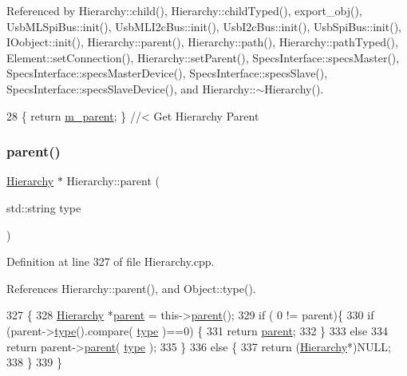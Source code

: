 Referenced by Hierarchy\+::child(), Hierarchy\+::child\+Typed(), export\+\_\+obj(), Usb\+M\+L\+Spi\+Bus\+::init(), Usb\+M\+L\+I2c\+Bus\+::init(), Usb\+I2c\+Bus\+::init(), Usb\+Spi\+Bus\+::init(), I\+Oobject\+::init(), Hierarchy\+::parent(), Hierarchy\+::path(), Hierarchy\+::path\+Typed(), Element\+::set\+Connection(), Hierarchy\+::set\+Parent(), Specs\+Interface\+::specs\+Master(), Specs\+Interface\+::specs\+Master\+Device(), Specs\+Interface\+::specs\+Slave(), Specs\+Interface\+::specs\+Slave\+Device(), and Hierarchy\+::$\sim$\+Hierarchy().


\begin{DoxyCode}
28 \{ \textcolor{keywordflow}{return} \hyperlink{classHierarchy_a5814bb280d4e8539ab25ab6cbfb9cc4f}{m\_parent}; \}  \textcolor{comment}{//< Get Hierarchy Parent}
\end{DoxyCode}
\mbox{\label{classHierarchy_ad550588733bf75ac5c0fcfd7c8fd11a6}} 
\subsubsection{\texorpdfstring{parent()}{parent()}\hspace{0.1cm}{\footnotesize\ttfamily [2/2]}}
{\footnotesize\ttfamily \hyperlink{classHierarchy}{Hierarchy} $\ast$ Hierarchy\+::parent (\begin{DoxyParamCaption}\item[{std\+::string}]{type }\end{DoxyParamCaption})\hspace{0.3cm}{\ttfamily [inherited]}}



Definition at line 327 of file Hierarchy.\+cpp.



References Hierarchy\+::parent(), and Object\+::type().


\begin{DoxyCode}
327                                             \{
328   \hyperlink{classHierarchy}{Hierarchy} *\hyperlink{classHierarchy_a1c7bec8257e717f9c1465e06ebf845fc}{parent} = this->\hyperlink{classHierarchy_a1c7bec8257e717f9c1465e06ebf845fc}{parent}();
329   \textcolor{keywordflow}{if} ( 0 != parent)\{
330     \textcolor{keywordflow}{if} (parent->\hyperlink{classObject_a84f99f70f144a83e1582d1d0f84e4e62}{type}().compare( \hyperlink{classObject_a84f99f70f144a83e1582d1d0f84e4e62}{type} )==0) \{
331       \textcolor{keywordflow}{return} \hyperlink{classHierarchy_a1c7bec8257e717f9c1465e06ebf845fc}{parent};
332     \}
333     \textcolor{keywordflow}{else}
334       \textcolor{keywordflow}{return} parent->\hyperlink{classHierarchy_a1c7bec8257e717f9c1465e06ebf845fc}{parent}( \hyperlink{classObject_a84f99f70f144a83e1582d1d0f84e4e62}{type} );
335   \}
336   \textcolor{keywordflow}{else} \{
337     \textcolor{keywordflow}{return} (\hyperlink{classHierarchy}{Hierarchy}*)NULL;
338   \}
339 \}
\end{DoxyCode}
\mbox{\label{classHierarchy_aa7990fa7caf132d83e361ce033c6c65a}} 
